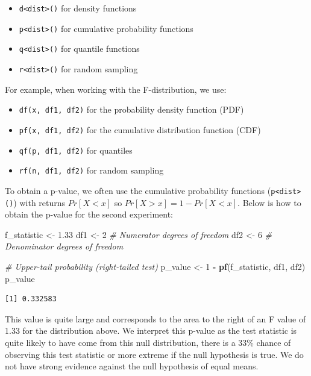 \documentclass[
  letterpaper,
]{book}
\newenvironment{Shaded}{\begin{snugshade}}{\end{snugshade}}
\newcommand{\CommentTok}[1]{\textcolor[rgb]{0.56,0.35,0.01}{\textit{#1}}}
\newcommand{\DecValTok}[1]{\textcolor[rgb]{0.00,0.00,0.81}{#1}}
\newcommand{\FloatTok}[1]{\textcolor[rgb]{0.00,0.00,0.81}{#1}}
\newcommand{\FunctionTok}[1]{\textcolor[rgb]{0.13,0.29,0.53}{\textbf{#1}}}
\newcommand{\NormalTok}[1]{#1}
\newcommand{\OtherTok}[1]{\textcolor[rgb]{0.56,0.35,0.01}{#1}}
\newcommand{\SpecialCharTok}[1]{\textcolor[rgb]{0.81,0.36,0.00}{\textbf{#1}}}
\providecommand{\tightlist}{%
  \setlength{\itemsep}{0pt}\setlength{\parskip}{0pt}}\usepackage{longtable,booktabs,array}
\begin{document}
\begin{itemize}
\tightlist
\item
  \texttt{d\textless{}dist\textgreater{}()} for density functions
\item
  \texttt{p\textless{}dist\textgreater{}()} for cumulative probability
  functions
\item
  \texttt{q\textless{}dist\textgreater{}()} for quantile functions
\item
  \texttt{r\textless{}dist\textgreater{}()} for random sampling
\end{itemize}

For example, when working with the F-distribution, we use:

\begin{itemize}
\tightlist
\item
  \texttt{df(x,\ df1,\ df2)} for the probability density function (PDF)
\item
  \texttt{pf(x,\ df1,\ df2)} for the cumulative distribution function
  (CDF)
\item
  \texttt{qf(p,\ df1,\ df2)} for quantiles
\item
  \texttt{rf(n,\ df1,\ df2)} for random sampling
\end{itemize}

To obtain a p-value, we often use the cumulative probability functions
(\texttt{p\textless{}dist\textgreater{}()}) with returns \(Pr[X<x]\) so
\(Pr[X>x] = 1 - Pr[X<x]\). Below is how to obtain the p-value for the
second experiment:

\begin{Shaded}
\begin{Highlighting}[]
\NormalTok{f\_statistic }\OtherTok{\textless{}{-}} \FloatTok{1.33}
\NormalTok{df1 }\OtherTok{\textless{}{-}} \DecValTok{2}  \CommentTok{\# Numerator degrees of freedom}
\NormalTok{df2 }\OtherTok{\textless{}{-}} \DecValTok{6}  \CommentTok{\# Denominator degrees of freedom}

\CommentTok{\# Upper{-}tail probability (right{-}tailed test)}
\NormalTok{p\_value }\OtherTok{\textless{}{-}} \DecValTok{1} \SpecialCharTok{{-}} \FunctionTok{pf}\NormalTok{(f\_statistic, df1, df2)}
\NormalTok{p\_value}
\end{Highlighting}
\end{Shaded}

\begin{verbatim}
[1] 0.332583
\end{verbatim}

This value is quite large and corresponds to the area to the right of an
F value of 1.33 for the distribution above. We interpret this p-value as
the test statistic is quite likely to have come from this null
distribution, there is a 33\% chance of observing this test statistic or
more extreme if the null hypothesis is true. We do not have strong
evidence against the null hypothesis of equal means.
\end{document}
